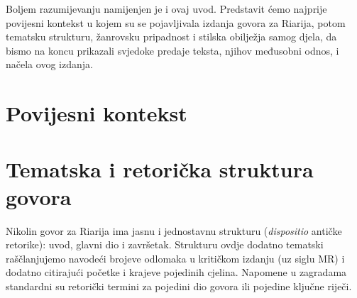 \documentclass[a5paper,twoside]{article}
\begin{document}
Boljem razumijevanju namijenjen je i ovaj uvod. Predstavit ćemo najprije povijesni kontekst u kojem su se pojavljivala izdanja govora za Riarija, potom tematsku strukturu, žanrovsku pripadnost i stilska obilježja samog djela, da bismo na koncu prikazali svjedoke predaje teksta, njihov međusobni odnos, i načela ovog izdanja. 

\section{Povijesni kontekst}

\section{Tematska i retorička struktura govora}

Nikolin govor za Riarija ima jasnu i jednostavnu strukturu (\textit{\textlatin{dispositio}} antičke retorike): uvod, glavni dio i završetak. Strukturu ovdje dodatno tematski raščlanjujemo navodeći brojeve odlomaka u kritičkom izdanju (uz siglu MR) i dodatno citirajući početke i krajeve pojedinih cjelina. Napomene u zagradama standardni su retorički termini za pojedini dio govora ili pojedine ključne riječi.
\end{document}
